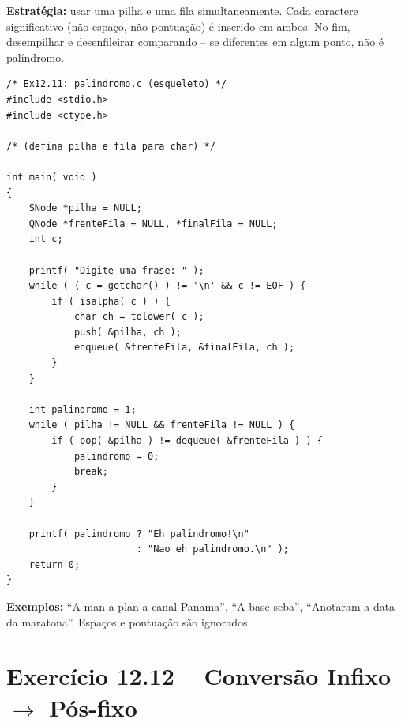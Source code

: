\documentclass[12pt,a4paper]{article}
\begin{document}
\begin{respostabox}
\textbf{Estratégia:} usar uma pilha e uma fila simultaneamente. Cada caractere
significativo (não-espaço, não-pontuação) é inserido em ambos. No fim,
desempilhar e desenfileirar comparando -- se diferentes em algum ponto, não é
palíndromo.

\begin{lstlisting}
/* Ex12.11: palindromo.c (esqueleto) */
#include <stdio.h>
#include <ctype.h>

/* (defina pilha e fila para char) */

int main( void )
{
    SNode *pilha = NULL;
    QNode *frenteFila = NULL, *finalFila = NULL;
    int c;

    printf( "Digite uma frase: " );
    while ( ( c = getchar() ) != '\n' && c != EOF ) {
        if ( isalpha( c ) ) {
            char ch = tolower( c );
            push( &pilha, ch );
            enqueue( &frenteFila, &finalFila, ch );
        }
    }

    int palindromo = 1;
    while ( pilha != NULL && frenteFila != NULL ) {
        if ( pop( &pilha ) != dequeue( &frenteFila ) ) {
            palindromo = 0;
            break;
        }
    }

    printf( palindromo ? "Eh palindromo!\n"
                       : "Nao eh palindromo.\n" );
    return 0;
}
\end{lstlisting}

\textbf{Exemplos:} ``A man a plan a canal Panama'', ``A base seba'', ``Anotaram a
data da maratona''. Espaços e pontuação são ignorados.
\end{respostabox}

\newpage

\section{Exercício 12.12 -- Conversão Infixo $\to$ Pós-fixo}
\end{document}
